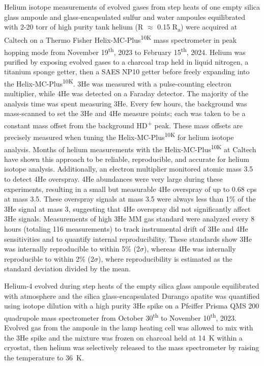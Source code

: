 Helium isotope measurements of evolved gases from step heats of one empty silica glass ampoule and glass-encapsulated sulfur and water ampoules equilibrated with 2-20 torr of high purity tank helium (R $\approx$ 0.15 R\textsubscript{a}) were acquired at Caltech on a Thermo Fisher Helix-MC-Plus\textsuperscript{10K} mass spectrometer in peak hopping mode from November 19\textsuperscript{th}, 2023 to February 15\textsuperscript{th}, 2024. Helium was purified by exposing evolved gases to a charcoal trap held in liquid nitrogen, a titanium sponge getter, then a SAES NP10 getter before freely expanding into the Helix-MC-Plus\textsuperscript{10K}. 3He was measured with a pulse-counting electron multiplier, while 4He was detected on a Faraday detector. The majority of the analysis time was spent measuring 3He. Every few hours, the background was mass-scanned to set the 3He and 4He measure points; each was taken to be a constant mass offset from the background HD\textsuperscript{+} peak. These mass offsets are precisely measured when tuning the Helix-MC-Plus\textsuperscript{10K} for helium isotope analysis. Months of helium measurements with the Helix-MC-Plus\textsuperscript{10K} at Caltech have shown this approach to be reliable, reproducible, and accurate for helium isotope analysis. Additionally, an electron multiplier monitored atomic mass 3.5 to detect 4He overspray. 4He abundances were very large during these experiments, resulting in a small but measurable 4He overspray of up to 0.68 cps at mass 3.5. These overspray signals at mass 3.5 were always less than 1\% of the 3He signal at mass 3, suggesting that 4He overspray did not significantly affect 3He signals. Measurements of high 3He MM gas standard were analyzed every 8 hours (totaling 116 measurements) to track instrumental drift of 3He and 4He sensitivities and to quantify internal reproducibility. These standards show 3He was internally reproducible to within 5\% (2$\sigma$), whereas 4He was internally reproducible to within 2\% (2$\sigma$), where reproducibility is estimated as the standard deviation divided by the mean.

Helium-4 evolved during step heats of the empty silica glass ampoule equilibrated with atmosphere and the silica glass-encapsulated Durango apatite was quantified using isotope dilution with a high purity 3He spike on a Pfeiffer Prisma QMS 200 quadrupole mass spectrometer from October 30\textsuperscript{th} to November 10\textsuperscript{th}, 2023. Evolved gas from the ampoule in the lamp heating cell was allowed to mix with the 3He spike and the mixture was frozen on charcoal held at 14~K within a cryostat, then helium was selectively released to the mass spectrometer by raising the temperature to 36~K.

